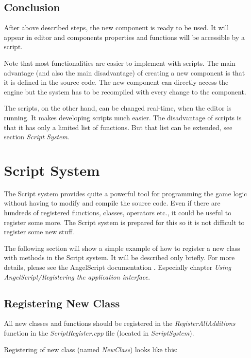 \documentclass[a4paper, 12pt]{report}
\begin{document}
\section{Conclusion}

After above described steps, the new component is ready to be used. It will appear in editor and components properties and functions will be accessible by a script.

Note that most functionalities are easier to implement with scripts. The main advantage (and also the main disadvantage) of creating a new component is that it is defined in the source code. The new component can directly access the engine but the system has to be recompiled with every change to the component. 

The scripts, on the other hand, can be changed real-time, when the editor is running. It makes developing scripts much easier. The disadvantage of scripts is that it has only a limited list of functions. But that list can be extended, see section \emph{Script System}.

\chapter{Script System}

The Script system provides quite a powerful tool for programming the game logic without having to modify and compile the source code. Even if there are hundreds of registered functions, classes, operators etc., it could be useful to register some more. The Script system is prepared for this so it is not difficult to register some new stuff.

The following section will show a simple example of how to register a new class with methods in the Script system. It will be described only briefly. For more details, please see the AngelScript documentation \cite{angelscript}. Especially chapter \emph{Using AngelScript/Registering the application interface}.

\section{Registering New Class}

All new classes and functions should be registered in the \emph{RegisterAllAdditions} function in the \emph{ScriptRegister.cpp} file (located in \emph{ScriptSystem}).

Registering of new class (named \emph{NewClass}) looks like this:
\end{document}
